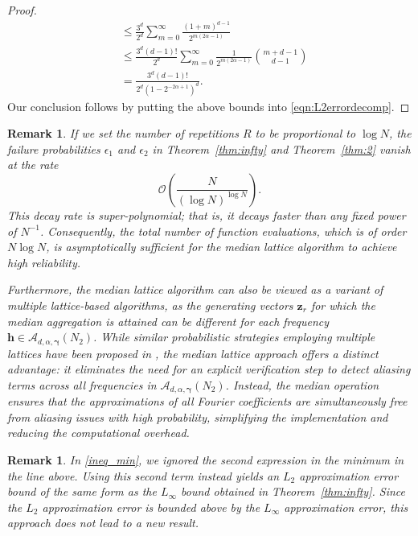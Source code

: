 \documentclass[a4paper,11pt]{article}
\newtheorem{remark}[theorem]{Remark}
\newcommand{\bsh}{\boldsymbol{h}}
\newcommand{\bsz}{\boldsymbol{z}}
\newcommand{\bsgamma}{\boldsymbol{\gamma}}
\newcommand{\Acal}{\mathcal{A}}
\begin{document}
\begin{proof}
\begin{align*}
 & \leq \frac{3^d}{2^d}\sum_{m=0}^\infty \frac{ (1 + m)^{d-1}}{ 2^{m (2\alpha-1)}  }   \\
 & \leq \frac{3^d(d-1)!}{2^d}  \sum_{m=0}^\infty \frac{1}{ 2^{m (2\alpha-1)}  }\binom{m+d-1}{d-1} \\ 
 & = \frac{ 3^d (d-1)! }{2^d(1- 2^{-2\alpha+1})^d}. 
 \end{align*}
 Our conclusion follows by putting the above bounds into \eqref{eqn:L2errordecomp}.
\end{proof}

\begin{remark}
If we set the number of repetitions $R$ to be proportional to $\log N$, the failure probabilities $\epsilon_1$ and $\epsilon_2$ in Theorem~\ref{thm:infty} and Theorem~\ref{thm:2} vanish at the rate
\[ \mathcal{O}\left( \frac{N}{(\log N)^{\log N}}\right).\]
This decay rate is super-polynomial; that is, it decays faster than any fixed power of $N^{-1}$. Consequently, the total number of function evaluations, which is of order $N\log N$, is asymptotically sufficient for the median lattice algorithm to achieve high reliability.

Furthermore, the median lattice algorithm can also be viewed as a variant of multiple lattice-based algorithms, as the generating vectors $\bsz_r$ for which the median aggregation is attained can be different for each frequency $\bsh\in \Acal_{d,\alpha,\bsgamma}(N_2)$. While similar probabilistic strategies employing multiple lattices have been proposed in \cite{CG26,K19, KV19}, the median lattice approach offers a distinct advantage: it eliminates the need for an explicit verification step to detect aliasing terms across all frequencies in $\mathcal{A}_{d,\alpha,\boldsymbol{\gamma}}(N_2)$. Instead, the median operation ensures that the approximations of all Fourier coefficients are simultaneously free from aliasing issues with high probability, simplifying the implementation and reducing the computational overhead.
\end{remark}

 
\begin{remark}
In \eqref{ineq_min}, we ignored the second expression in the minimum in the line above. Using this second term instead yields an $L_2$ approximation error bound of the same form as the $L_\infty$ bound obtained in Theorem~\ref{thm:infty}. Since the $L_2$ approximation error is bounded above by the $L_\infty$ approximation error, this approach does not lead to a new result.
\end{remark}
\end{document}
